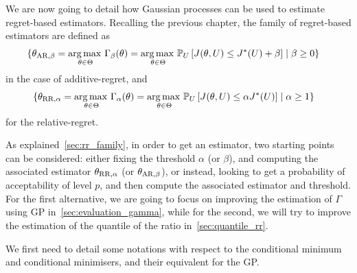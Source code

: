 \documentclass[../../Main_ManuscritThese.tex]{subfiles}
\begin{document}
We are now going to detail how Gaussian processes can be used to
estimate regret-based estimators.  Recalling the previous chapter, the
family of regret-based estimators are defined as
\begin{align}
  \{ {\theta}_{\mathrm{AR,\beta}} &= \operatorname*{arg\,max \,}_{\theta\in\Theta} \Gamma_\beta(\theta) = \operatorname*{arg\,max \,}_{\theta\in\Theta} \mathbb{P}_{U}\left[J(\theta, U) \leq J^*(U) + \beta \right] \mid \beta \geq 0 \}
\end{align}
in the case of additive-regret, and
\begin{align}
  \{ {\theta}_{\mathrm{RR,\alpha}} &= \operatorname*{arg\,max \,}_{\theta\in\Theta} \Gamma_\alpha(\theta) = \operatorname*{arg\,max \,}_{\theta\in\Theta}\mathbb{P}_{U}\left[J(\theta, U) \leq \alpha J^*(U)\right] \mid \alpha \geq 1 \}
\end{align}
for the relative-regret.

As explained~\cref{sec:rr_family}, in order to get an estimator, two
starting points can be considered: either fixing the threshold
$\alpha$ (or $\beta$), and computing the associated estimator
${\theta}_{\mathrm{RR,\alpha}}$ (or ${\theta}_{\mathrm{AR,\beta}}$), or
instead, looking to get a probability of acceptability of level $p$,
and then compute the associated estimator and threshold. For the first
alternative, we are going to focus on improving the estimation of
$\Gamma$ using GP in~\cref{sec:evaluation_gamma}, while for the
second, we will try to improve the estimation of the quantile of the
ratio in~\cref{sec:quantile_rr}.


We first need to detail some notations with respect to the conditional
minimum and conditional minimisers, and their equivalent for the GP.
\end{document}
